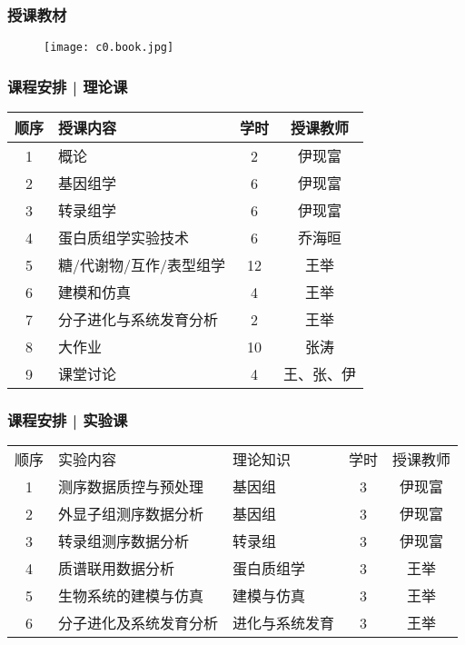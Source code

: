 \begin{frame}
\end{frame}

\begin{frame}
  \frametitle{授课教材}
  \begin{figure}
    \centering
    \texttt{[image: c0.book.jpg]}
  \end{figure}
\end{frame}

\begin{frame}
  \frametitle{课程安排 | 理论课}
  \begin{table}
    \centering
    \begin{tabular}{clcc}
      \hline
      \rowcolor{blue!50}顺序 & 授课内容 & 学时 & 授课教师\\
      \hline
      1 & 概论 & 2 & 伊现富\\
      2 & 基因组学 & 6 & 伊现富\\
      3 & 转录组学 & 6 & 伊现富\\
      4 & 蛋白质组学实验技术 & 6 & 乔海晅\\
      5 & 糖/代谢物/互作/表型组学 & 12 & 王举\\
      6 & 建模和仿真 & 4 & 王举\\
      7 & 分子进化与系统发育分析 & 2 & 王举\\
      8 & 大作业 & 10 & 张涛\\
      9 & 课堂讨论 & 4 & 王、张、伊\\
      \hline
    \end{tabular}
  \end{table}
\end{frame}

\begin{frame}
  \frametitle{课程安排 | 实验课}
  \begin{table}
    \centering
    \begin{tabular}{cllcc}
      \hline
      \rowcolor{blue!50}顺序 & 实验内容 & 理论知识 & 学时 & 授课教师\\
      1 & 测序数据质控与预处理 & 基因组 & 3 & 伊现富\\
      2 & 外显子组测序数据分析 & 基因组 & 3 & 伊现富\\
      3 & 转录组测序数据分析 & 转录组 & 3 & 伊现富\\
      4 & 质谱联用数据分析& 蛋白质组学 & 3 & 王举\\
      5 & 生物系统的建模与仿真& 建模与仿真 & 3 & 王举\\
      6 & 分子进化及系统发育分析& 进化与系统发育 & 3 & 王举\\
      \hline
    \end{tabular}
  \end{table}
\end{frame}

